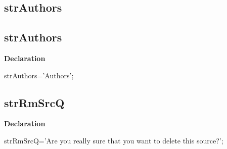 \documentclass{report}
\newif\ifpdf
\begin{document}
\subsection*{\large{\textbf{strAuthors}}\normalsize\hspace{1ex}\hrulefill}
\else
\subsection*{strAuthors}
\fi
\label{trstrings-strAuthors}
\begin{list}{}{
\setlength{\itemindent}{0cm}
\setlength{\listparindent}{0cm}
\setlength{\leftmargin}{\evensidemargin}
\addtolength{\leftmargin}{\tmplength}
\settowidth{\labelsep}{X}
\addtolength{\leftmargin}{\labelsep}
\setlength{\labelwidth}{\tmplength}
}
\item[\textbf{Declaration}\hfill]
\ifpdf
\begin{flushleft}
\fi
\begin{ttfamily}
strAuthors='Authors';\end{ttfamily}

\ifpdf
\end{flushleft}
\fi

\end{list}
\ifpdf
\subsection*{\large{\textbf{strRmSrcQ}}\normalsize\hspace{1ex}\hrulefill}
\else
\subsection*{strRmSrcQ}
\fi
\label{trstrings-strRmSrcQ}
\begin{list}{}{
\setlength{\itemindent}{0cm}
\setlength{\listparindent}{0cm}
\setlength{\leftmargin}{\evensidemargin}
\addtolength{\leftmargin}{\tmplength}
\settowidth{\labelsep}{X}
\addtolength{\leftmargin}{\labelsep}
\setlength{\labelwidth}{\tmplength}
}
\item[\textbf{Declaration}\hfill]
\ifpdf
\begin{flushleft}
\fi
\begin{ttfamily}
strRmSrcQ='Are you really sure that you want to delete this source?';\end{ttfamily}

\ifpdf
\end{flushleft}
\fi

\end{list}
\ifpdf
\end{document}
